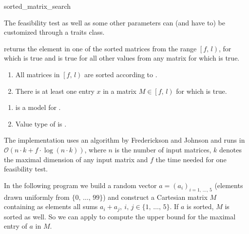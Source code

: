 \begin{ccRefFunction}{sorted_matrix_search}
\begin{ccAdvanced}
    The feasibility test as well as some other parameters can (and
    have to) be customized through a traits class. 
    

    \def\ccLongParamLayout{\ccTrue} 
    

    returns the element  in one of the sorted matrices from the
    range $\left[ f,\, l \right)$, for which 
    is true and  is true for all other
     values from any matrix for which  is true.
    
    \ccPrecond
    \begin{enumerate}
    \item All matrices in $\left[f,\, l\right)$ are sorted according
      to .
    \item There is at least one entry $x$ in a matrix $M \in
      \left[f,\, l\right)$ for which  is
      true.
    \end{enumerate}
    
    \ccRequire
    \begin{enumerate}
    \item {} is a model for
      .
    \item Value type of  is
      .
    \end{enumerate}
    
    \ccSeeAlso
    
    \ccImplementation The implementation uses an algorithm by
    Frederickson and Johnson\cite{fj-fkppc-83,fj-gsrsm-84} and runs in
    $\mathcal{O}(n \cdot k + f \cdot \log (n \cdot k))$, where $n$ is
    the number of input matrices, $k$ denotes the maximal dimension of
    any input matrix and $f$ the time needed for one feasibility test.
    
    \ccExample In the following program we build a random vector $a =
    (a_i)_{i = 1,\,\ldots,\,5}$ (elements drawn uniformly from $\{
    0,\,\ldots,\,99 \}$) and construct a Cartesian matrix $M$
    containing as elements all sums $a_i + a_j,\: i,\,j \in
    \{1,\,\ldots,\,5\}$. If $a$ is sorted, $M$ is sorted as well. So
    we can apply  to compute the upper bound
    for the maximal entry of $a$ in $M$.
    

  \end{ccAdvanced}
\end{ccRefFunction}

